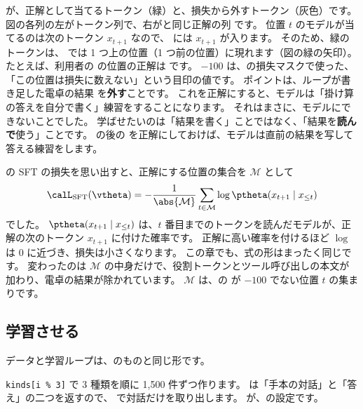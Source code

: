 が、正解として当てるトークン（緑）と、損失から外すトークン（灰色）です。
図の各列の左がトークン列で、右がと同じ正解の列  です。
位置 $t$ のモデルが当てるのは次のトークン $x_{t+1}$ なので、 には $x_{t+1}$ が入ります。
そのため、緑のトークンは、 では 1 つ上の位置（1 つ前の位置）に現れます（図の緑の矢印）。
たとえば、利用者の  の位置の正解は  です。
$-100$ は、の損失マスクで使った、「この位置は損失に数えない」という目印の値です。
ポイントは、ループが書き足した電卓の結果  を\textbf{外す}ことです。
これを正解にすると、モデルは「掛け算の答えを自分で書く」練習をすることになります。
それはまさに、モデルにできないことでした。
学ばせたいのは「結果を書く」ことではなく、「結果を\textbf{読んで}使う」ことです。
 の後の  を正解にしておけば、モデルは直前の結果を写して答える練習をします。

の SFT の損失を思い出すと、正解にする位置の集合を $\mathcal{M}$ として
\begin{equation}
\calL_{\text{SFT}}(\vtheta) = -\frac{1}{\abs{\mathcal{M}}}\sum_{t\in\mathcal{M}} \log \ptheta(x_{t+1}\mid x_{\le t})
\label{eq:agent-tool-sft-loss}
\end{equation}
でした。
$\ptheta(x_{t+1}\mid x_{\le t})$ は、$t$ 番目までのトークンを読んだモデルが、正解の次のトークン $x_{t+1}$ に付けた確率です。
正解に高い確率を付けるほど $\log$ は 0 に近づき、損失は小さくなります。
この章でも、式の形はまったく同じです。
変わったのは $\mathcal{M}$ の中身だけで、役割トークンとツール呼び出しの本文が加わり、電卓の結果が除かれています。
$\mathcal{M}$ は、の  が $-100$ でない位置 $t$ の集まりです。

\subsection{学習させる}

データと学習ループは、のものと同じ形です。


\texttt{kinds[i \% 3]} で 3 種類を順に 1,500 件ずつ作ります。
 は「手本の対話」と「答え」の二つを返すので、\code{[0]} で対話だけを取り出します。
 が、の設定です。

